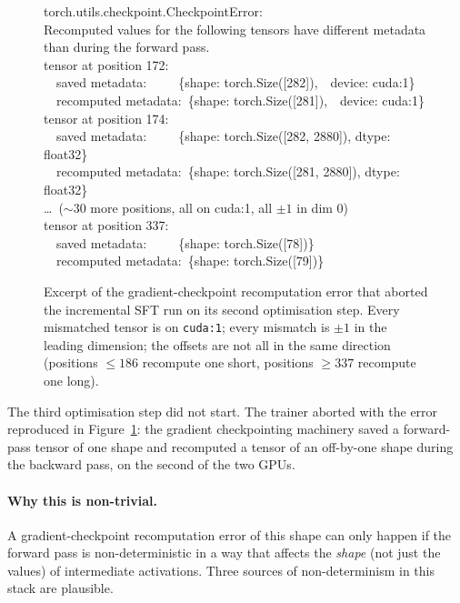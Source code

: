 \documentclass[11pt]{article}
\begin{document}
\begin{figure}[h]
\centering
\begin{tcolorbox}[
  enhanced, colback=c4!8, colframe=c4, boxrule=0.5pt,
  arc=2pt, fontupper=\ttfamily\scriptsize, sharp corners=south,
  title=\rmfamily\textbf{Failure at step 2/396 --- gradient checkpoint recompute mismatch},
  fonttitle=\rmfamily\small,
]
torch.utils.checkpoint.CheckpointError:\\
Recomputed values for the following tensors have different metadata\\
than during the forward pass.\\[2pt]
tensor at position 172:\\
\ \ saved metadata:\ \ \ \ \ \{shape: torch.Size([282]),\ \ device: cuda:1\}\\
\ \ recomputed metadata:\ \{shape: torch.Size([281]),\ \ device: cuda:1\}\\
tensor at position 174:\\
\ \ saved metadata:\ \ \ \ \ \{shape: torch.Size([282, 2880]), dtype: float32\}\\
\ \ recomputed metadata:\ \{shape: torch.Size([281, 2880]), dtype: float32\}\\
\dots\ ($\sim\!30$ more positions, all on cuda:1, all $\pm 1$ in dim 0)\\[2pt]
tensor at position 337:\\
\ \ saved metadata:\ \ \ \ \ \{shape: torch.Size([78])\}\\
\ \ recomputed metadata:\ \{shape: torch.Size([79])\}
\end{tcolorbox}
\caption{Excerpt of the gradient-checkpoint recomputation error
that aborted the incremental SFT run on its second optimisation step.
Every mismatched tensor is on \texttt{cuda:1}; every mismatch is
$\pm 1$ in the leading dimension; the offsets are not all in the same
direction (positions $\le 186$ recompute one short, positions $\ge
337$ recompute one long).}
\label{fig:checkpoint-error}
\end{figure}

The third optimisation step did not start. The trainer aborted with
the error reproduced in Figure~\ref{fig:checkpoint-error}: the
gradient checkpointing machinery saved a forward-pass tensor of one
shape and recomputed a tensor of an off-by-one shape during the
backward pass, on the second of the two GPUs.

\paragraph{Why this is non-trivial.} A gradient-checkpoint
recomputation error of this shape can only happen if the forward pass
is non-deterministic in a way that affects the \emph{shape} (not just
the values) of intermediate activations. Three sources of
non-determinism in this stack are plausible.
\end{document}
